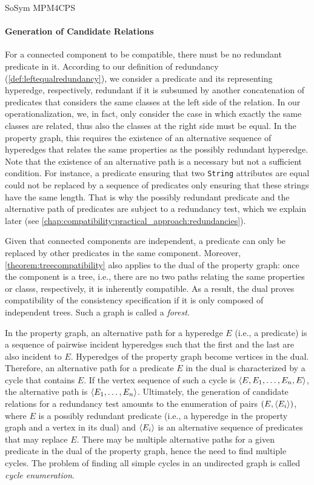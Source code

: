 \begin{copiedFrom}{SoSym MPM4CPS}
\paragraph{Generation of Candidate Relations}
For a connected component to be compatible, there must be no redundant predicate in it. 
According to our definition of redundancy (\autoref{def:leftequalredundancy}), we consider a predicate and its representing hyperedge, respectively, redundant if it is subsumed by another concatenation of predicates that considers the same classes at the left side of the relation.
In our operationalization, we, in fact, only consider the case in which exactly the same classes are related, thus also the classes at the right side must be equal.
In the property graph, this requires the existence of an alternative sequence of hyperedges that relates the same properties as the possibly redundant hyperedge.
Note that the existence of an alternative path is a necessary but not a sufficient condition. For instance, a predicate ensuring that two \texttt{String} attributes are equal could not be replaced by a sequence of predicates only ensuring that these strings have the same length. That is why the possibly redundant predicate and the alternative path of predicates are subject to a redundancy test, which we explain later (see \autoref{chap:compatibility:practical_approach:redundancies}).

Given that connected components are independent, a predicate can only be replaced by other predicates in the same component. Moreover, \autoref{theorem:treecompatibility} also applies to the dual of the property graph: once the component is a tree, i.e., there are no two paths relating the same properties or classs, respectively, it is inherently compatible. As a result, the dual proves compatibility of the consistency specification if it is only composed of independent trees. Such a graph is called a \textit{forest}.

In the property graph, an alternative path for a hyperedge $E$ (i.e., a predicate) is a sequence of pairwise incident hyperedges such that the first and the last are also incident to $E$. Hyperedges of the property graph become vertices in the dual. Therefore, an alternative path for a predicate $E$ in the dual is characterized by a cycle that contains $E$. If the vertex sequence of such a cycle is $\langle E, E_1, \dots, E_n, E \rangle$, the alternative path is $\langle E_1, \dots, E_n \rangle$. Ultimately, the generation of candidate relations for a redundancy test amounts to the enumeration of pairs $(E, \langle E_i \rangle)$, where $E$ is a possibly redundant predicate (i.e., a hyperedge in the property graph and a vertex in its dual) and $\langle E_i \rangle$ is an alternative sequence of predicates that may replace $E$. There may be multiple alternative paths for a given predicate in the dual of the property graph, hence the need to find multiple cycles. The problem of finding all simple cycles in an undirected graph is called \textit{cycle enumeration}.


\end{copiedFrom}
